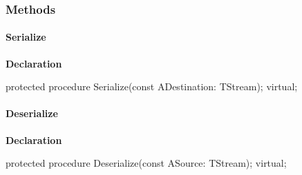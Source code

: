 \documentclass{report}
\newif\ifpdf
\begin{document}
\subsubsection*{\large{\textbf{Methods}}\normalsize\hspace{1ex}\hfill}
\paragraph*{Serialize}\hspace*{\fill}

\label{PasDoc_Serialize.TSerializable-Serialize}
\begin{list}{}{
\setlength{\itemindent}{0cm}
\setlength{\listparindent}{0cm}
\setlength{\leftmargin}{\evensidemargin}
\addtolength{\leftmargin}{\tmplength}
\settowidth{\labelsep}{X}
\addtolength{\leftmargin}{\labelsep}
\setlength{\labelwidth}{\tmplength}
}
\item[\textbf{Declaration}\hfill]
\ifpdf
\begin{flushleft}
\fi
\begin{ttfamily}
protected procedure Serialize(const ADestination: TStream); virtual;\end{ttfamily}

\ifpdf
\end{flushleft}
\fi

\end{list}
\paragraph*{Deserialize}\hspace*{\fill}

\label{PasDoc_Serialize.TSerializable-Deserialize}
\begin{list}{}{
\setlength{\itemindent}{0cm}
\setlength{\listparindent}{0cm}
\setlength{\leftmargin}{\evensidemargin}
\addtolength{\leftmargin}{\tmplength}
\settowidth{\labelsep}{X}
\addtolength{\leftmargin}{\labelsep}
\setlength{\labelwidth}{\tmplength}
}
\item[\textbf{Declaration}\hfill]
\ifpdf
\begin{flushleft}
\fi
\begin{ttfamily}
protected procedure Deserialize(const ASource: TStream); virtual;\end{ttfamily}

\ifpdf
\end{flushleft}
\fi

\end{list}
\end{document}
